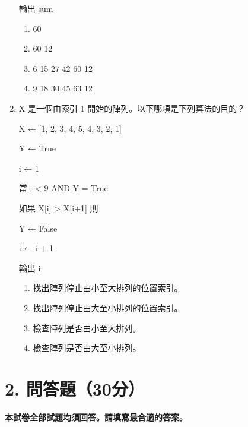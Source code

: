 \documentclass[12pt,a4paper]{article}
\begin{document}
\begin{enumerate}
輸出 sum

\begin{enumerate}[label=\Alph*.]
\item 60
\item 60 12
\item 6 15 27 42 60 12
\item 9 18 30 45 63 12
\end{enumerate}

\item X 是一個由索引 1 開始的陣列。以下哪項是下列算法的目的？

X ← [1, 2, 3, 4, 5, 4, 3, 2, 1]

Y ← True

i ← 1

當 i < 9 AND Y = True

如果 X[i] > X[i+1] 則

Y ← False

i ← i + 1

輸出 i

\begin{enumerate}[label=\Alph*.]
\item 找出陣列停止由小至大排列的位置索引。
\item 找出陣列停止由大至小排列的位置索引。
\item 檢查陣列是否由小至大排列。
\item 檢查陣列是否由大至小排列。
\end{enumerate}

\end{enumerate}

\newpage

\section{\textbf{2. 問答題（30分）}}

\textbf{本試卷全部試題均須回答。請填寫最合適的答案。}
\end{document}
